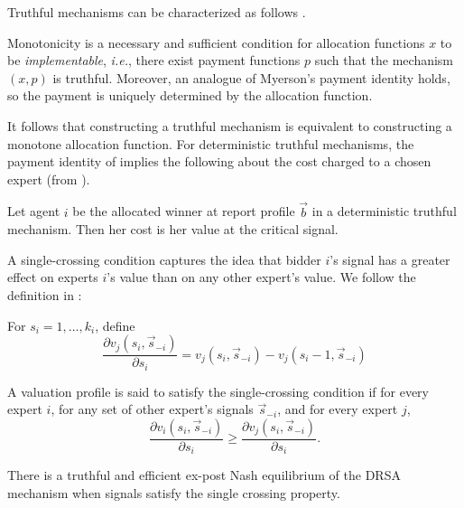 Truthful mechanisms can be characterized as follows \cite{roughgarden2016optimal}.

\begin{prop}\label{prop:char-ic}
	Monotonicity is a necessary and sufficient condition for allocation functions $x$ to be \emph{implementable}, {\sl i.e.}, there exist payment functions $p$ such that the mechanism $(x,p)$ is truthful.  Moreover, an analogue of Myerson's payment identity holds, so the payment is uniquely determined by the allocation function.%
\end{prop}

It follows that constructing a truthful mechanism is equivalent to constructing a monotone allocation function.
For deterministic truthful mechanisms, the payment identity of \citet{roughgarden2016optimal} implies the following about the cost charged to a chosen expert (from \cite{eden2018interdependent}).

\begin{prop}\label{prop:deterministic_payment}
	Let agent $i$ be the allocated winner at report profile $\vec{b}$ in a deterministic truthful mechanism. Then her cost is her value at the critical signal.
\end{prop}


A single-crossing condition captures the idea that bidder $i$'s signal has a greater effect on experts $i$'s value than on any other expert's value. We follow the definition in \cite{eden2018interdependent}:

For $s_i = 1, \ldots, k_i$, define $$\frac{\partial v_j(s_i, \vec{s}_{-i})}{\partial s_i} = v_j(s_i, \vec{s}_{-i}) - v_j(s_i - 1, \vec{s}_{-i})$$

\begin{defn}
	A valuation profile is said to satisfy the single-crossing condition if for every expert $i$, for any set of other expert's  signals $\vec{s}_{-i}$, and for every expert $j$, $$\frac{\partial v_i(s_i, \vec{s}_{-i})}{\partial s_i} \geq \frac{\partial v_j(s_i, \vec{s}_{-i})}{\partial s_i}.$$
\end{defn}



\begin{thm}
	There is a truthful and efficient ex-post Nash equilibrium of the DRSA mechanism when signals satisfy the single crossing property.
\end{thm}

